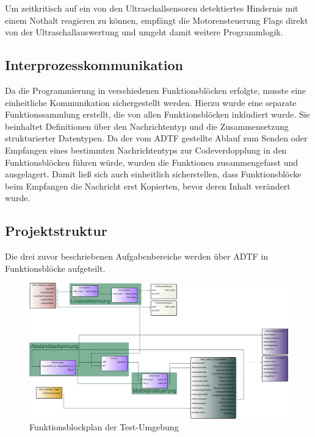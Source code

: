 \documentclass[12pt, a4paper]{scrartcl}
\begin{document}
Um zeitkritisch auf ein von den Ultraschallsensoren detektiertes Hindernis mit einem Nothalt reagieren zu können, empfängt die Motorensteuerung Flags direkt von der Ultraschallauswertung und umgeht damit weitere Programmlogik.
   

\subsection{Interprozesskommunikation}

Da die Programmierung in verschiedenen Funktionsblöcken erfolgte, musste eine einheitliche Kommunikation sichergestellt werden. Hierzu wurde eine separate Funktionssammlung erstellt, die von allen Funktionsblöcken inkludiert wurde. Sie beinhaltet Definitionen über den Nachrichtentyp und die Zusammensetzung strukturierter Datentypen. Da der vom ADTF gestellte Ablauf zum Senden oder Empfangen eines bestimmten Nachrichtentyps zur Codeverdopplung in den Funktionsblöcken führen würde, wurden die Funktionen zusammengefasst und ausgelagert. Damit ließ sich auch einheitlich sicherstellen, dass Funktionsblöcke beim Empfangen die Nachricht erst Kopierten, bevor deren Inhalt verändert wurde.

\subsection{Projektstruktur}
Die drei zuvor beschriebenen Aufgabenbereiche werden über ADTF in Funktionsblöcke aufgeteilt.



\begin{figure}[ht]
	\centering
	\includegraphics[width=\textwidth, height=\textheight, keepaspectratio]{Bilder/FunktionsblockplanE.png}
	\caption{Funktionsblockplan der Test-Umgebung}
	\label{img:funktionsblockplan}
\end{figure}
\end{document}
